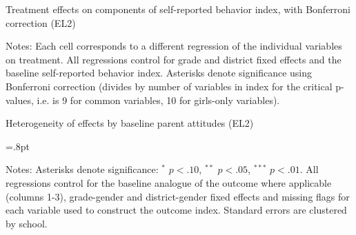 \documentclass[letterpaper,12pt,pdftex]{article}
\begin{document}
\clearpage
\newpage

\begin{table}
\tabcolsep=6pt
		\caption{Treatment effects on components of self-reported behavior index, with Bonferroni correction (EL2)}
		\label{tab_behatt_ivars_el2}
		\begin{center}
			\footnotesize{}
		\end{center}
\flushleft \footnotesize {Notes: Each cell corresponds to a different regression of the individual variables on treatment. All regressions control for grade and district fixed effects and the baseline self-reported behavior index. Asterisks denote significance using Bonferroni correction (divides by number of variables in index for the critical p-values, i.e. is 9 for common variables, 10 for girls-only variables).}
\end{table}

\clearpage
\newpage



\begin{table}
	\caption{Heterogeneity of effects by baseline parent attitudes (EL2)}\label{tab_parent_heterog_el2}
	\centering
	\tabcolsep=.8pt
	\footnotesize
	
	\flushleft \footnotesize {Notes: Asterisks denote significance: $^*$ $p < .10$, $^{**}$ $p < .05$, $^{***}$ $p < .01$. All regressions control for the baseline analogue of the outcome where applicable (columns 1-3), grade-gender and district-gender fixed effects and missing flags for each variable used to construct the outcome index. Standard errors are clustered by school.}
\end{table}
\end{document}
